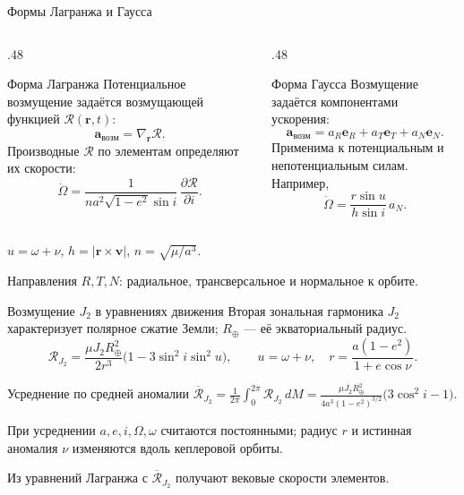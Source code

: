 \documentclass[11pt,aspectratio=169,t]{beamer}
\begin{document}
\begin{frame}{Формы Лагранжа и Гаусса}
\setlength{\abovedisplayskip}{4pt}\setlength{\belowdisplayskip}{4pt}
\begin{columns}[T,onlytextwidth]
\begin{column}{.48\textwidth}
\begin{block}{Форма Лагранжа}
\justifying
Потенциальное возмущение задаётся возмущающей функцией $\mathcal R(\mathbf r,t)$:
\[
\mathbf a_{\text{возм}}=\nabla_{\mathbf r}\mathcal R.
\]
Производные $\mathcal R$ по элементам определяют их скорости:
\[
\dot\Omega=\frac{1}{na^2\sqrt{1-e^2}\sin i}\,
\frac{\partial\mathcal R}{\partial i}.
\]
\end{block}
\end{column}
\begin{column}{.48\textwidth}
\begin{block}{Форма Гаусса}
\justifying
Возмущение задаётся компонентами ускорения:
\[
\mathbf a_{\text{возм}}=a_R\mathbf e_R+a_T\mathbf e_T+a_N\mathbf e_N.
\]
Применима к потенциальным и непотенциальным силам. Например,
\[
\dot\Omega=\frac{r\sin u}{h\sin i}\,a_N.
\]
\end{block}
\end{column}
\end{columns}
\smallskip
$u=\omega+\nu$, $h=\lvert\mathbf r\times\mathbf v\rvert$, $n=\sqrt{\mu/a^3}$.
\par\smallskip
Направления $R,T,N$: радиальное, трансверсальное и нормальное к орбите.
\end{frame}

\begin{frame}{Возмущение $J_2$ в уравнениях движения}
\setlength{\abovedisplayskip}{4pt}\setlength{\belowdisplayskip}{4pt}
\justifying
Вторая зональная гармоника $J_2$ характеризует полярное сжатие Земли;
$R_\oplus$ --- её экваториальный радиус.
\[
\mathcal R_{J_2}=\frac{\mu J_2R_\oplus^2}{2r^3}
\bigl(1-3\sin^2i\sin^2u\bigr),
\qquad u=\omega+\nu,\quad r=\frac{a(1-e^2)}{1+e\cos\nu}.
\]
\begin{block}{Усреднение по средней аномалии}
\centering
$\displaystyle
\overline{\mathcal R}_{J_2}
=\frac{1}{2\pi}\int_0^{2\pi}\mathcal R_{J_2}\,dM
=\frac{\mu J_2R_\oplus^2}{4a^3(1-e^2)^{3/2}}
\bigl(3\cos^2i-1\bigr).$
\par\smallskip\justifying
При усреднении $a,e,i,\Omega,\omega$ считаются постоянными;
радиус $r$ и истинная аномалия $\nu$ изменяются вдоль кеплеровой орбиты.
\end{block}
\justifying
Из уравнений Лагранжа с $\overline{\mathcal R}_{J_2}$ получают вековые скорости элементов.
\end{frame}
\end{document}
